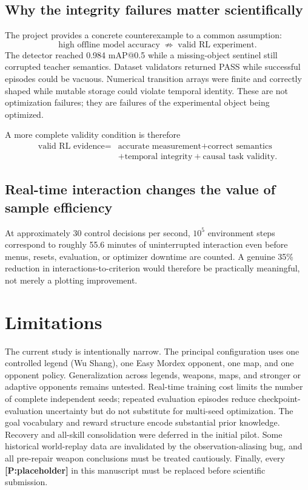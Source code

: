 \documentclass[11pt]{article}
\newcommand{\projected}[1]{\textcolor{Projection}{\textbf{[P:#1]}}}
\begin{document}
\subsection{Why the integrity failures matter scientifically}
The project provides a concrete counterexample to a common assumption:
\begin{equation}
\text{high offline model accuracy}\;\not\Rightarrow\;\text{valid RL experiment}.
\end{equation}
The detector reached 0.984 mAP@0.5 while a missing-object sentinel still corrupted teacher semantics. Dataset validators returned PASS while successful episodes could be vacuous. Numerical transition arrays were finite and correctly shaped while mutable storage could violate temporal identity. These are not optimization failures; they are failures of the experimental object being optimized.

A more complete validity condition is therefore
\begin{equation}
\boxed{
\begin{aligned}
\text{valid RL evidence}={}&\text{accurate measurement}+\text{correct semantics}\\
&+\text{temporal integrity}+\text{causal task validity}.
\end{aligned}}
\end{equation}

\subsection{Real-time interaction changes the value of sample efficiency}
At approximately 30 control decisions per second, $10^5$ environment steps correspond to roughly 55.6 minutes of uninterrupted interaction even before menus, resets, evaluation, or optimizer downtime are counted. A genuine 35\% reduction in interactions-to-criterion would therefore be practically meaningful, not merely a plotting improvement.

\section{Limitations}
The current study is intentionally narrow. The principal configuration uses one controlled legend (Wu Shang), one Easy Mordex opponent, one map, and one opponent policy. Generalization across legends, weapons, maps, and stronger or adaptive opponents remains untested. Real-time training cost limits the number of complete independent seeds; repeated evaluation episodes reduce checkpoint-evaluation uncertainty but do not substitute for multi-seed optimization. The goal vocabulary and reward structure encode substantial prior knowledge. Recovery and all-skill consolidation were deferred in the initial pilot. Some historical world-replay data are invalidated by the observation-aliasing bug, and all pre-repair weapon conclusions must be treated cautiously. Finally, every \projected{placeholder} in this manuscript must be replaced before scientific submission.
\end{document}
